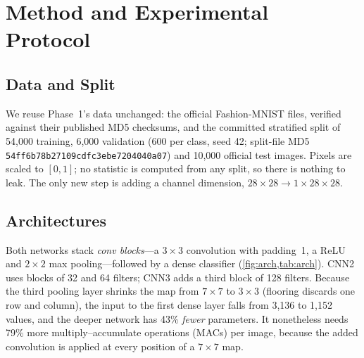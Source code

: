 \documentclass[conference]{IEEEtran}
\begin{document}
\section{Method and Experimental Protocol}
\label{sec:method}

\subsection{Data and Split}
We reuse Phase~1's data unchanged: the official Fashion-MNIST files, verified against their published MD5 checksums, and
the committed stratified split of 54{,}000 training, 6{,}000 validation (600 per class, seed 42; split-file MD5
\texttt{54ff6b78\allowbreak b27109cd\allowbreak fc3ebe72\allowbreak 04040a07}) and 10{,}000 official test images.
Pixels are scaled to $[0,1]$; no statistic is computed from any split, so there is nothing to leak. The only new step is
adding a channel dimension, $28\times28 \to 1\times28\times28$.

\subsection{Architectures}
Both networks stack \emph{conv blocks}---a $3\times3$ convolution with padding~1, a ReLU and $2\times2$ max
pooling---followed by a dense classifier (\cref{fig:arch,tab:arch}). CNN2 uses blocks of 32 and 64 filters; CNN3 adds a
third block of 128 filters. Because the third pooling layer shrinks the map from $7\times7$ to $3\times3$ (flooring
discards one row and column), the input to the first dense layer falls from 3{,}136 to 1{,}152 values, and the deeper
network has 43\% \emph{fewer} parameters. It nonetheless needs 79\% more multiply--accumulate operations (MACs) per
image, because the added convolution is applied at every position of a $7\times7$ map.
\end{document}

